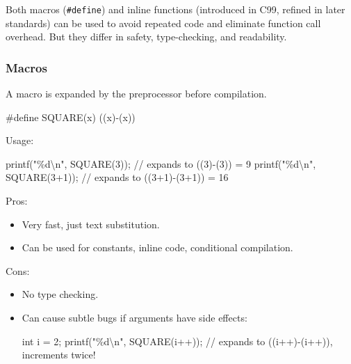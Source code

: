 \documentclass[
  letterpaper,
  DIV=11,
  numbers=noendperiod]{scrreprt}
\newenvironment{Shaded}{\begin{snugshade}}{\end{snugshade}}
\newcommand{\CommentTok}[1]{\textcolor[rgb]{0.37,0.37,0.37}{#1}}
\newcommand{\DataTypeTok}[1]{\textcolor[rgb]{0.68,0.00,0.00}{#1}}
\newcommand{\DecValTok}[1]{\textcolor[rgb]{0.68,0.00,0.00}{#1}}
\newcommand{\NormalTok}[1]{\textcolor[rgb]{0.00,0.23,0.31}{#1}}
\newcommand{\OperatorTok}[1]{\textcolor[rgb]{0.37,0.37,0.37}{#1}}
\newcommand{\PreprocessorTok}[1]{\textcolor[rgb]{0.68,0.00,0.00}{#1}}
\newcommand{\SpecialCharTok}[1]{\textcolor[rgb]{0.37,0.37,0.37}{#1}}
\newcommand{\StringTok}[1]{\textcolor[rgb]{0.13,0.47,0.30}{#1}}
\providecommand{\tightlist}{%
  \setlength{\itemsep}{0pt}\setlength{\parskip}{0pt}}
\begin{document}
Both macros (\texttt{\#define}) and inline functions (introduced in C99,
refined in later standards) can be used to avoid repeated code and
eliminate function call overhead. But they differ in safety,
type-checking, and readability.

\subsubsection{Macros}\label{macros}

A macro is expanded by the preprocessor before compilation.

\begin{Shaded}
\begin{Highlighting}[]
\PreprocessorTok{\#define SQUARE}\OperatorTok{(}\PreprocessorTok{x}\OperatorTok{)}\PreprocessorTok{ }\OperatorTok{((}\PreprocessorTok{x}\OperatorTok{){-}(}\PreprocessorTok{x}\OperatorTok{))}
\end{Highlighting}
\end{Shaded}

Usage:

\begin{Shaded}
\begin{Highlighting}[]
\NormalTok{printf}\OperatorTok{(}\StringTok{"}\SpecialCharTok{\%d\textbackslash{}n}\StringTok{"}\OperatorTok{,}\NormalTok{ SQUARE}\OperatorTok{(}\DecValTok{3}\OperatorTok{));}    \CommentTok{// expands to ((3){-}(3)) = 9}
\NormalTok{printf}\OperatorTok{(}\StringTok{"}\SpecialCharTok{\%d\textbackslash{}n}\StringTok{"}\OperatorTok{,}\NormalTok{ SQUARE}\OperatorTok{(}\DecValTok{3}\OperatorTok{+}\DecValTok{1}\OperatorTok{));}  \CommentTok{// expands to ((3+1){-}(3+1)) = 16}
\end{Highlighting}
\end{Shaded}

Pros:

\begin{itemize}
\tightlist
\item
  Very fast, just text substitution.
\item
  Can be used for constants, inline code, conditional compilation.
\end{itemize}

Cons:

\begin{itemize}
\item
  No type checking.
\item
  Can cause subtle bugs if arguments have side effects:

\begin{Shaded}
\begin{Highlighting}[]
\DataTypeTok{int}\NormalTok{ i }\OperatorTok{=} \DecValTok{2}\OperatorTok{;}
\NormalTok{printf}\OperatorTok{(}\StringTok{"}\SpecialCharTok{\%d\textbackslash{}n}\StringTok{"}\OperatorTok{,}\NormalTok{ SQUARE}\OperatorTok{(}\NormalTok{i}\OperatorTok{++));}  \CommentTok{// expands to ((i++){-}(i++)), increments twice!}
\end{Highlighting}
\end{Shaded}
\end{itemize}
\end{document}
